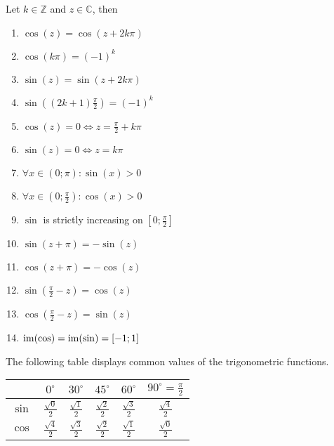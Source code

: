 \begin{proposition}[Properties]
   Let \(k \in \mathbb{Z}\) and \(z \in \mathbb{C}\), then
   \begin{enumerate}[label=\roman*, align=Center]
      \item \(\cos(z) = \cos(z + 2k\pi)\)
      \item \(\cos(k\pi) = (-1)^k\)
      \item \(\sin(z) = \sin(z + 2k\pi)\)
      \item \(\sin\left((2k+1)\frac{\pi}{2}\right) = (-1)^k\)
      \item \(\cos(z) = 0 \iff z = \frac{\pi}{2} + k\pi\)
      \item \(\sin(z) = 0 \iff z = k\pi\)
      \item \(\forall x \in (0; \pi): \sin(x) > 0\)
      \item \(\forall x \in \left(0; \frac{\pi}{2}\right): \cos(x) > 0\)
      \item \(\sin\) is strictly increasing on \(\left[0; \frac{\pi}{2}\right]\)
      \item \(\sin(z + \pi) = -\sin(z)\)
      \item \(\cos(z + \pi) = -\cos(z)\)
      \item \(\sin\left(\frac{\pi}{2} - z\right) = \cos(z)\)
      \item \(\cos\left(\frac{\pi}{2} - z\right) = \sin(z)\)
      \item \(\operatorname{im}(\cos) = \operatorname{im}(\sin) = [-1;1]\)
   \end{enumerate}
\end{proposition}
\begin{remark}
   The following table displays common values of the trigonometric functions.
   \begin{center}
      \renewcommand\arraystretch{1.3}
      \begin{tabular}{c|c|c|c|c|c}
              & \(0^\circ\) & \(30^\circ\) & \(45^\circ\) & \(60^\circ\) & \(90^\circ = \frac{\pi}{2}\)\\
         \hline
         \(\sin\) & \(\frac{\sqrt{0}}{2}\) & \(\frac{\sqrt{1}}{2}\) & \(\frac{\sqrt{2}}{2}\) & \(\frac{\sqrt{3}}{2}\) & \(\frac{\sqrt{4}}{2}\)\\
         \hline
         \(\cos\) & \(\frac{\sqrt{4}}{2}\) & \(\frac{\sqrt{3}}{2}\) & \(\frac{\sqrt{2}}{2}\) & \(\frac{\sqrt{1}}{2}\) & \(\frac{\sqrt{0}}{2}\)\\
      \end{tabular}
   \end{center}
\end{remark}

